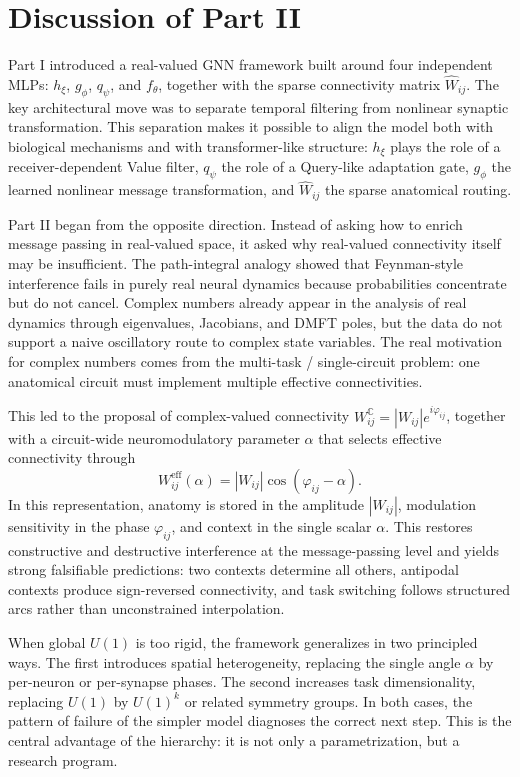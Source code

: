 \documentclass[11pt]{article}
\begin{document}
\section{Discussion of Part II}

Part I introduced a real-valued GNN framework built around four independent MLPs: $h_\xi$, $g_\phi$, $q_\psi$, and $f_\theta$, together with the sparse connectivity matrix $\hat{W}_{ij}$. The key architectural move was to separate temporal filtering from nonlinear synaptic transformation. This separation makes it possible to align the model both with biological mechanisms and with transformer-like structure: $h_\xi$ plays the role of a receiver-dependent Value filter, $q_\psi$ the role of a Query-like adaptation gate, $g_\phi$ the learned nonlinear message transformation, and $\hat{W}_{ij}$ the sparse anatomical routing.

Part II began from the opposite direction. Instead of asking how to enrich message passing in real-valued space, it asked why real-valued connectivity itself may be insufficient. The path-integral analogy showed that Feynman-style interference fails in purely real neural dynamics because probabilities concentrate but do not cancel. Complex numbers already appear in the analysis of real dynamics through eigenvalues, Jacobians, and DMFT poles, but the data do not support a naive oscillatory route to complex state variables. The real motivation for complex numbers comes from the multi-task / single-circuit problem: one anatomical circuit must implement multiple effective connectivities.

This led to the proposal of complex-valued connectivity $W_{ij}^{\mathbb{C}} = |W_{ij}|e^{i\varphi_{ij}}$, together with a circuit-wide neuromodulatory parameter $\alpha$ that selects effective connectivity through
\[
W_{ij}^{\text{eff}}(\alpha)=|W_{ij}|\cos(\varphi_{ij}-\alpha).
\]
In this representation, anatomy is stored in the amplitude $|W_{ij}|$, modulation sensitivity in the phase $\varphi_{ij}$, and context in the single scalar $\alpha$. This restores constructive and destructive interference at the message-passing level and yields strong falsifiable predictions: two contexts determine all others, antipodal contexts produce sign-reversed connectivity, and task switching follows structured arcs rather than unconstrained interpolation.

When global $U(1)$ is too rigid, the framework generalizes in two principled ways. The first introduces spatial heterogeneity, replacing the single angle $\alpha$ by per-neuron or per-synapse phases. The second increases task dimensionality, replacing $U(1)$ by $U(1)^k$ or related symmetry groups. In both cases, the pattern of failure of the simpler model diagnoses the correct next step. This is the central advantage of the hierarchy: it is not only a parametrization, but a research program.
\end{document}
